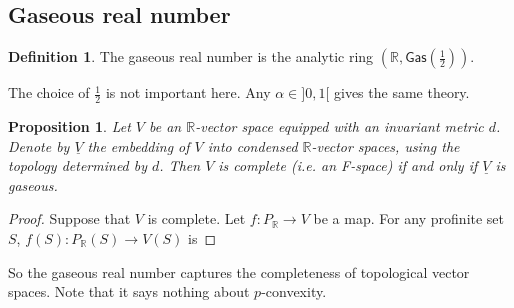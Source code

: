 \documentclass{article}
\theoremstyle{plain}
\newtheorem{prop}[thm]{Proposition}
\theoremstyle{definition}
\newtheorem{defi}[thm]{Definition}
\theoremstyle{remark}
\begin{document}
\subsection{Gaseous real number}

\begin{defi}
The gaseous real number is the analytic ring $ (\mathbb{R}, \mathsf{Gas}(\frac{1}{2})) $.
\end{defi}

The choice of $ \frac{1}{2} $ is not important here. Any $ \alpha\in ]0, 1[ $ gives the same theory.

\begin{prop}
Let $ V $ be an $ \mathbb{R} $-vector space equipped with an invariant metric $ d $.
Denote by $ \underline{V} $ the embedding of $ V $ into condensed $ \mathbb{R} $-vector spaces, using the topology determined by $ d $.
Then $ V $ is complete (i.e. an F-space) if and only if $ \underline{V} $ is gaseous.
\end{prop}

\begin{proof}
Suppose that $ V $ is complete.
Let $ f: P _{\mathbb{R}} \to V $ be a map.
For any profinite set $ S $, $ f (S) : P _{\mathbb{R}} (S) \to V (S) $ is 
\end{proof}

So the gaseous real number captures the completeness of topological vector spaces.
Note that it says nothing about $ p $-convexity.

%

\printbibliography
\end{document}
